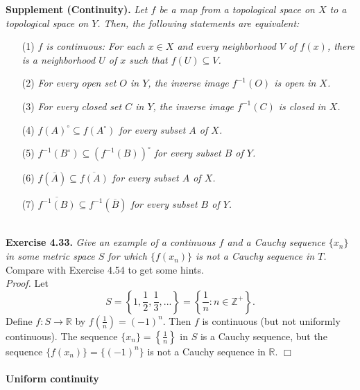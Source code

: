 \documentclass{article}
\begin{document}
\textbf{Supplement (Continuity).}
\emph{Let $f$ be a map from a topological space on $X$
to a topological space on $Y$.
Then, the following statements are equivalent:}
\begin{enumerate}
\item[(1)]
\emph{$f$ is continuous:
For each $x \in X$ and every neighborhood $V$ of $f(x)$,
there is a neighborhood $U$ of $x$ such that $f(U) \subseteq V$.}
\item[(2)]
\emph{For every open set $O$ in $Y$, the inverse image $f^{-1}(O)$
is open in $X$.}
\item[(3)]
\emph{For every closed set $C$ in $Y$, the inverse image $f^{-1}(C)$
is closed in $X$.}
\item[(4)]
\emph{$f(A)^{\circ} \subseteq f(A^{\circ})$ for every subset $A$ of $X$.}
\item[(5)]
\emph{$f^{-1}(B^{\circ}) \subseteq (f^{-1}(B))^{\circ}$ for every subset $B$ of $Y$.}
\item[(6)]
\emph{$f(\overline{A}) \subseteq \overline{f(A)}$ for every subset $A$ of $X$.}
\item[(7)]
\emph{$\overline{f^{-1}(B)} \subseteq f^{-1}(\overline{B})$ for every subset $B$ of $Y$.} \\\\
\end{enumerate}



\textbf{Exercise 4.33.}
\emph{Give an example of a continuous $f$ and a Cauchy sequence $\{x_n\}$
in some metric space $S$ for which $\{f(x_n)\}$ is not a Cauchy sequence in $T$.} \\

Compare with Exercise 4.54 to get some hints. \\

\emph{Proof.}
Let
$$S
= \left\{ 1, \frac{1}{2}, \frac{1}{3}, ... \right\}
= \left\{ \frac{1}{n} : n \in \mathbb{Z}^+ \right\}.$$
Define $f: S \rightarrow \mathbb{R}$ by $f\left(\frac{1}{n}\right) = (-1)^n$.
Then $f$ is continuous (but not uniformly continuous).
The sequence $\{x_n\} = \left\{ \frac{1}{n} \right\}$ in $S$ is a Cauchy sequence,
but the sequence $\{f(x_n)\} = \{(-1)^n\}$ is not a Cauchy sequence in $\mathbb{R}$.
$\Box$ \\\\



\textbf{\large Uniform continuity} \\\\
\end{document}
